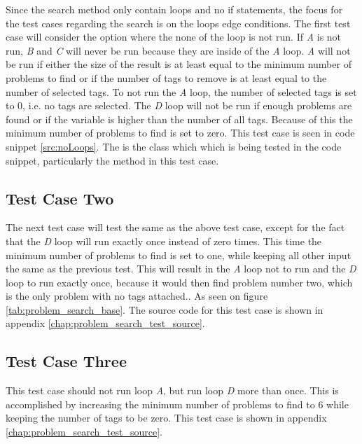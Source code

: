 Since the search method only contain loops and no if statements, the focus for the test cases regarding the search is on the loops edge conditions.
The first test case will consider the option where the none of the loop is not run.
If \textit{A} is not run, \textit{B} and \textit{C} will never be run because they are inside of the \textit{A} loop.
\textit{A} will not be run if either the size of the result is at least equal to the minimum number of problems to find or if the number of tags to remove is at least equal to the number of selected tags.
To not run the \textit{A} loop, the number of selected tags is set to 0, i.e. no tags are selected.
The \textit{D} loop will not be run if enough problems are found or if the  variable is higher than the number of all tags.
Because of this the minimum number of problems to find is set to zero.
This test case is seen in code snippet \ref{src:noLoops}.
The  is the class which which is being tested in the code snippet, particularly the  method in this test case.

\subsection{Test Case Two}
The next test case will test the same as the above test case, except for the fact that the \textit{D} loop will run exactly once instead of zero times.
This time the minimum number of problems to find is set to one, while keeping all other input the same as the previous test.
This will result in the \textit{A} loop not to run and the \textit{D} loop to run exactly once, because it would then find problem number two, which is the only problem with no tags attached.. As seen on figure \ref{tab:problem_search_base}.
The source code for this test case is shown in appendix \ref{chap:problem_search_test_source}.

\subsection{Test Case Three}
This test case should not run loop \textit{A}, but run loop \textit{D} more than once.
This is accomplished by increasing the minimum number of problems to find to 6 while keeping the number of tags to be zero.
This test case is shown in appendix \ref{chap:problem_search_test_source}.

